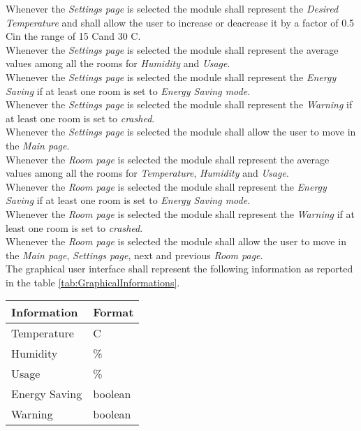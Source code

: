 Whenever the \textit{Settings page} is selected the module shall represent the \textit{Desired Temperature} and shall allow the user to increase or deacrease it by a factor of 0.5 C\degree in the range of 15 C\degree and 30 C\degree.\\
Whenever the \textit{Settings page} is selected the module shall represent the average values among all the rooms for \textit{Humidity} and \textit{Usage}.\\
Whenever the \textit{Settings page} is selected the module shall represent the \textit{Energy Saving} if at least one room is set to \textit{Energy Saving mode}.\\
Whenever the \textit{Settings page} is selected the module shall represent the \textit{Warning} if at least one room is set to \textit{crashed}.\\
Whenever the \textit{Settings page} is selected the module shall allow the user to move in the \textit{Main page}.\\

Whenever the \textit{Room page} is selected the module shall represent the average values among all the rooms for \textit{Temperature}, \textit{Humidity} and \textit{Usage}.\\
Whenever the \textit{Room page} is selected the module shall represent the \textit{Energy Saving} if at least one room is set to \textit{Energy Saving mode}.\\
Whenever the \textit{Room page} is selected the module shall represent the \textit{Warning} if at least one room is set to \textit{crashed}.\\
Whenever the \textit{Room page} is selected the module shall allow the user to move in the \textit{Main page}, \textit{Settings page}, next and previous \textit{Room page}.\\

The graphical user interface shall represent the following information as reported in the table \ref{tab:GraphicalInformations}.
\begin{table}[H]
	\centering
			\begin{tabular}{||l | l||} 
			\hline
			\textbf{Information}	& \textbf{Format} \\ 
			\hline
			Temperature	& C\degree \\ 
			\hline
			Humidity	& \% \\ 
			\hline
			Usage		& \% \\ 
			\hline
			Energy Saving	& boolean \\ 
			\hline
			Warning		& boolean \\ 
			\hline
		\end{tabular}
\end{table}

